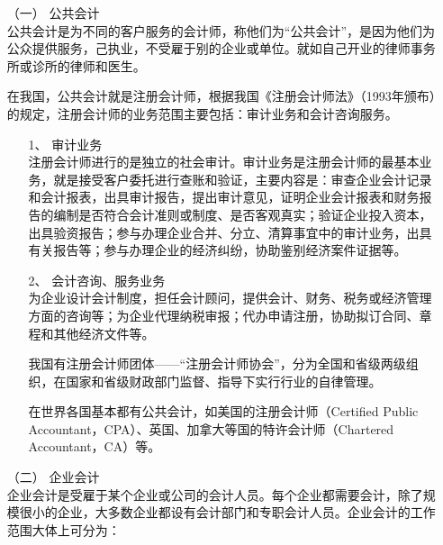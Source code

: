 				\begin{enumerate}
					\item[（一）] 公共会计 \\
						公共会计是为不同的客户服务的会计师，称他们为“公共会计”，是因为他们为公众提供服务，己执业，不受雇于别的企业或单位。就如自己开业的律师事务所或诊所的律师和医生。

						在我国，公共会计就是注册会计师，根据我国《注册会计师法》（1993年颁布）的规定，注册会计师的业务范围主要包括：审计业务和会计咨询服务。

						\begin{enumerate}
							\item[1、] 审计业务 \\
								注册会计师进行的是独立的社会审计。审计业务是注册会计师的最基本业务，就是接受客户委托进行查账和验证，主要内容是：审查企业会计记录和会计报表，出具审计报告，提出审计意见，证明企业会计报表和财务报告的编制是否符合会计准则或制度、是否客观真实；验证企业投入资本，出具验资报告；参与办理企业合并、分立、清算事宜中的审计业务，出具有关报告等；参与办理企业的经济纠纷，协助鉴别经济案件证据等。

							\item[2、] 会计咨询、服务业务 \\
								为企业设计会计制度，担任会计顾问，提供会计、财务、税务或经济管理方面的咨询等；为企业代理纳税审报；代办申请注册，协助拟订合同、章程和其他经济文件等。

								我国有注册会计师团体——“注册会计师协会”，分为全国和省级两级组织，在国家和省级财政部门监督、指导下实行行业的自律管理。

								在世界各国基本都有公共会计，如美国的注册会计师（Certified Public Accountant，CPA）、英国、加拿大等国的特许会计师（Chartered Accountant，CA）等。

						\end{enumerate}

					\item[（二）] 企业会计 \\
						企业会计是受雇于某个企业或公司的会计人员。每个企业都需要会计，除了规模很小的企业，大多数企业都设有会计部门和专职会计人员。企业会计的工作范围大体上可分为：


\end{enumerate}
